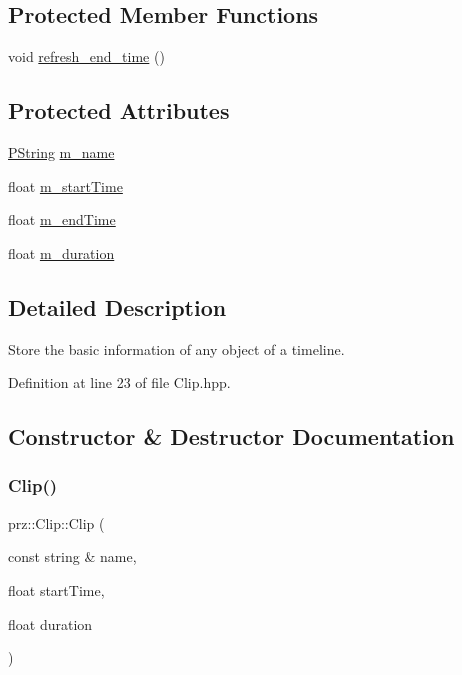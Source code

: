 \subsection*{Protected Member Functions}
\begin{DoxyCompactItemize}
\item 
void \mbox{\hyperlink{classprz_1_1_clip_a2b970808e50b0003a638c78ba6d26200}{refresh\+\_\+end\+\_\+time}} ()
\end{DoxyCompactItemize}
\subsection*{Protected Attributes}
\begin{DoxyCompactItemize}
\item 
\mbox{\hyperlink{classprz_1_1_p_string}{P\+String}} \mbox{\hyperlink{classprz_1_1_clip_a9480162480731a020244153ada1219aa}{m\+\_\+name}}
\item 
float \mbox{\hyperlink{classprz_1_1_clip_ae9023bc80aedb38fcf1b9bc619a6f70c}{m\+\_\+start\+Time}}
\item 
float \mbox{\hyperlink{classprz_1_1_clip_abca99f03f5bc3963ee2c813b33a52d8e}{m\+\_\+end\+Time}}
\item 
float \mbox{\hyperlink{classprz_1_1_clip_abf582141d0a2385e1ec2e94cc9eca70b}{m\+\_\+duration}}
\end{DoxyCompactItemize}


\subsection{Detailed Description}
Store the basic information of any object of a timeline. 



Definition at line 23 of file Clip.\+hpp.



\subsection{Constructor \& Destructor Documentation}
\mbox{\label{classprz_1_1_clip_a8ca22ea87ef621e73273048b7f950918}} 
\subsubsection{\texorpdfstring{Clip()}{Clip()}\hspace{0.1cm}{\footnotesize\ttfamily [1/3]}}
{\footnotesize\ttfamily prz\+::\+Clip\+::\+Clip (\begin{DoxyParamCaption}\item[{const string \&}]{name,  }\item[{float}]{start\+Time,  }\item[{float}]{duration }\end{DoxyParamCaption})}




